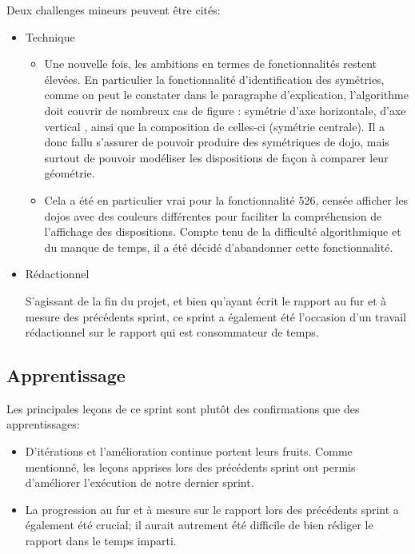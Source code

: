 Deux challenges mineurs peuvent être cités:
\begin{itemize}
    \item Technique
          \begin{itemize}
              \item Une nouvelle fois, les ambitions en termes de fonctionnalités restent élevées. En particulier la fonctionnalité
                    d'identification des symétries, comme on peut le constater dans le paragraphe d’explication, l’algorithme doit couvrir
                    de nombreux cas de figure : symétrie d’axe horizontale, d’axe vertical , ainsi que la composition de celles-ci (symétrie centrale).
                    Il a donc fallu s’assurer de pouvoir produire des symétriques de dojo, mais surtout de pouvoir modéliser les dispositions de façon
                    à comparer leur géométrie.
              \item Cela a été en particulier vrai pour la fonctionnalité 526, censée afficher les dojos avec des couleurs différentes pour faciliter
                    la compréhension de l’affichage des dispositions. Compte tenu de la difficulté algorithmique et du manque de temps, il a été décidé
                    d’abandonner cette fonctionnalité.

          \end{itemize}
    \item Rédactionnel

          S’agissant de la fin du projet, et bien qu’ayant écrit le rapport au fur et à mesure des précédents sprint, ce sprint a également été
          l’occasion d’un travail rédactionnel sur le rapport qui est consommateur de temps.

\end{itemize}

\subsection{Apprentissage}

Les principales leçons de ce sprint sont plutôt des confirmations que des apprentissages:
\begin{itemize}
    \item D'itérations et l'amélioration continue portent leurs fruits. Comme mentionné, les leçons apprises lors des précédents sprint
          ont permis d'améliorer l'exécution de notre dernier sprint.
    \item La progression au fur et à mesure sur le rapport lors des précédents sprint a également été crucial; il aurait autrement été
          difficile de bien rédiger le rapport dans le temps imparti.
\end{itemize}

